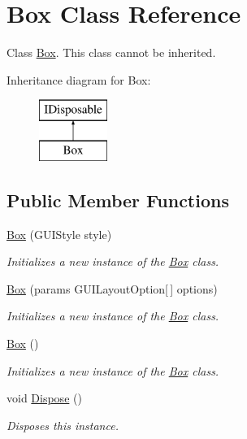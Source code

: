 \hypertarget{class_box}{}\section{Box Class Reference}
\label{class_box}


Class \hyperlink{class_box}{Box}. This class cannot be inherited.  


Inheritance diagram for Box\+:\begin{figure}[H]
\begin{center}
\leavevmode
\includegraphics[height=2.000000cm]{class_box}
\end{center}
\end{figure}
\subsection*{Public Member Functions}
\begin{DoxyCompactItemize}
\item 
\hyperlink{class_box_ae72544881fa98a2f438f3602dee6c8c5}{Box} (G\+U\+I\+Style style)
\begin{DoxyCompactList}\small\item\em Initializes a new instance of the \hyperlink{class_box}{Box} class. \end{DoxyCompactList}\item 
\hyperlink{class_box_a00e3d2864acc9cb2c7cb12eb7bb9734d}{Box} (params G\+U\+I\+Layout\+Option\mbox{[}$\,$\mbox{]} options)
\begin{DoxyCompactList}\small\item\em Initializes a new instance of the \hyperlink{class_box}{Box} class. \end{DoxyCompactList}\item 
\hyperlink{class_box_ad53a682f16ccaa51b35b9b5bd2ba8ce5}{Box} ()
\begin{DoxyCompactList}\small\item\em Initializes a new instance of the \hyperlink{class_box}{Box} class. \end{DoxyCompactList}\item 
void \hyperlink{class_box_ac9ce247b8a06dc8f0b3bea024ef51956}{Dispose} ()
\begin{DoxyCompactList}\small\item\em Disposes this instance. \end{DoxyCompactList}\end{DoxyCompactItemize}


